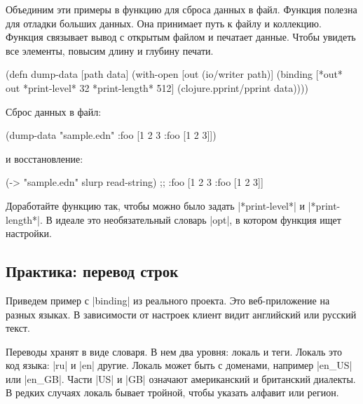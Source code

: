 Объединим эти примеры в функцию для сброса данных в файл. Функция полезна для
отладки больших данных. Она принимает путь к файлу и коллекцию. Функция
связывает вывод с открытым файлом и печатает данные. Чтобы увидеть все элементы,
повысим длину и глубину печати.

\begin{english}
  \begin{clojure}
(defn dump-data
  [path data]
  (with-open [out (io/writer path)]
    (binding [*out* out
              *print-level* 32
              *print-length* 512]
      (clojure.pprint/pprint data))))
  \end{clojure}
\end{english}

\noindent
Сброс данных в файл:

\begin{english}
  \begin{clojure}
(dump-data "sample.edn" {:foo [1 2 3 {:foo [1 2 3]}]})
  \end{clojure}
\end{english}

\noindent
и восстановление:

\begin{english}
  \begin{clojure}
(-> "sample.edn" slurp read-string)
;; {:foo [1 2 3 {:foo [1 2 3]}]}
  \end{clojure}
\end{english}

Доработайте функцию так, чтобы можно было задать \spverb|*print-level*| и
\spverb|*print-length*|. В идеале это необязательный словарь \spverb|opt|, в
котором функция ищет настройки.

\subsection{Практика: перевод строк}

Приведем пример с \spverb|binding| из реального проекта. Это веб-приложение на
разных языках. В зависимости от настроек клиент видит английский или русский
текст.

Переводы хранят в виде словаря. В нем два уровня: локаль и теги. Локаль это код
языка: \spverb|ru| и \spverb|en| другие. Локаль может быть с доменами, например
\spverb|en_US| или \spverb|en_GB|. Части \spverb|US| и \spverb|GB| означают
американский и британский диалекты. В редких случаях локаль бывает тройной,
чтобы указать алфавит или регион.

